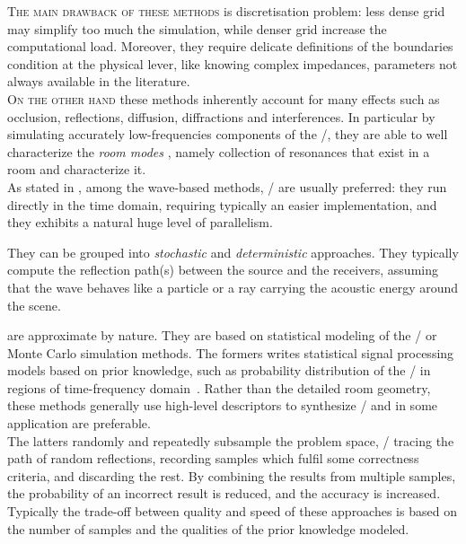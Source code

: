 \textsc{The main drawback of these methods} is discretisation problem:
less dense grid may simplify too much the simulation, while denser grid increase the computational load.
Moreover, they require delicate definitions of the boundaries condition at the physical lever,
like knowing complex impedances, parameters not always available in the literature.
\\\textsc{On the other hand} these methods inherently account for many effects such as occlusion, reflections, diffusion, diffractions and interferences.
In particular by simulating accurately low-frequencies components of the \RIR/, they are able to well characterize the \textit{room modes}
,
namely collection of resonances that exist in a room and characterize it.
\\As stated in , among the wave-based methods, \DWMf/ are usually preferred:
they run directly in the time domain, requiring typically an easier implementation, and they exhibits a natural huge level of parallelism.

They can be grouped into \textit{stochastic} and \textit{deterministic} approaches.
They typically compute the reflection path(s) between the source and the receivers,
assuming that the wave behaves like a particle or a ray carrying the acoustic energy around the scene.

 are approximate by nature.
They are based on statistical modeling of the \RIRs/ or Monte Carlo simulation methods.
The formers writes statistical signal processing models based on prior knowledge,
such as probability distribution of the \RIR/ in regions of time-frequency domain~.
Rather than the detailed room geometry, these methods generally use high-level descriptors
to synthesize \RIRs/ and in some application are preferable.
\\The latters randomly and repeatedly subsample the problem space, \eg/ tracing the path of random reflections,
recording samples which fulfil some correctness criteria, and discarding the rest.
By combining the results from multiple samples, the probability of an incorrect result is reduced, and the accuracy is increased.
Typically the trade-off between quality and speed of these approaches is based on the number of samples and
the qualities of the prior knowledge modeled.

